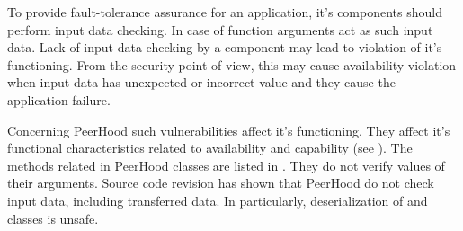 
%
To provide fault-tolerance assurance for an application, it's components should perform input data checking. 
%
In case of  function arguments act as such input data. 
%
Lack of input data checking by a component may lead to violation of it's functioning. 
%
From the security point of view, this may cause availability violation when input data has unexpected or incorrect value and they cause the application failure. 

%
Concerning PeerHood such vulnerabilities affect it's functioning. 
%
They affect it's functional characteristics related to availability and capability (see ). 
%
The methods related in PeerHood  classes are listed in . 
%
They do not verify values of their arguments. 
%
Source code revision has shown that PeerHood do not check input data, including transferred data. 
%
In particularly, deserialization of  and  classes is unsafe. 

